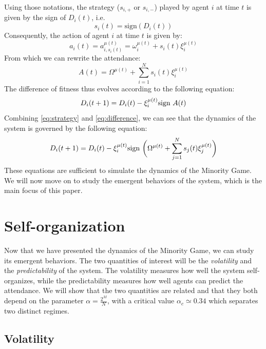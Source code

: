 \documentclass[a4paper, amsfonts, amssymb, amsmath, reprint, showkeys, nofootinbib, twoside]{revtex4-1}
\begin{document}
Using those notations, the strategy ($s_{i,+}$ or $s_{i,-}$) played by agent $i$ at time $t$ is given by the sign of $D_i(t)$, i.e.
\begin{equation}
\label{eq:strategy}
    s_i(t) = \text{sign}(D_i(t))
\end{equation}
Consequently, the action of agent $i$ at time $t$ is given by:
\begin{equation}
    a_i(t) = a_{i,s_i(t)}^{\mu(t)} = \omega_i^{\mu(t)} + s_i(t) \xi_i^{\mu(t)}
\end{equation}
From which we can rewrite the attendance:
\begin{equation}
    A(t) = \Omega^{\mu(t)} + \sum_{i=1}^N s_i(t) \xi_i^{\mu(t)}
\end{equation}
The difference of fitness thus evolves according to the following equation:
\begin{equation}
\label{eq:difference}
    D_i(t+1) = D_i(t) - \xi_i^{\mu(t)} \textnormal{sign }A(t)
\end{equation}
Combining \eqref{eq:strategy} and \eqref{eq:difference}, we can see that the dynamics of the system is governed by the following equation:
\begin{equation}
\label{eq:dynamics}
    D_i(t+1) = D_i(t) - \xi_i^{\mu(t)} \textnormal{sign }\bigg(\Omega^{\mu(t)} + \sum_{j=1}^N s_j(t) \xi_j^{\mu(t)}\bigg)
\end{equation}
These equations are sufficient to simulate the dynamics of the Minority Game. We will now move on to study the emergent behaviors of the system, which is the main focus of this paper.


\section{Self-organization}
\label{sec:self-organization}

Now that we have presented the dynamics of the Minority Game, we can study its emergent behaviors. The two quantities of interest will be the \textit{volatility} and the \textit{predictability} of the system. The volatility measures how well the system self-organizes, while the predictability measures how well agents can predict the attendance. We will show that the two quantities are related and that they both depend on the parameter $\alpha = \frac{2^M}{N}$, with a critical value $\alpha_c \simeq 0.34$ which separates two distinct regimes.

\subsection{Volatility}
\end{document}
